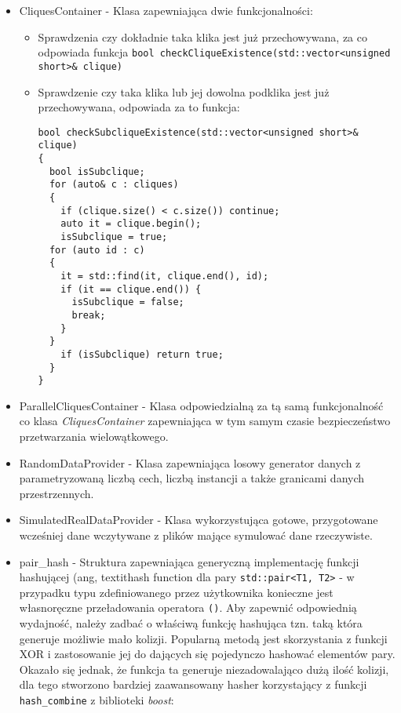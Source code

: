 \documentclass[12pt]{article}
\begin{document}
\begin{itemize}
\item CliquesContainer - Klasa zapewniająca dwie funkcjonalności:
\begin{itemize}
\item Sprawdzenia czy dokładnie taka klika jest już przechowywana, za co odpowiada funkcja \raggedleft \lstinline{bool checkCliqueExistence(std::vector<unsigned short>& clique)}
\item Sprawdzenie czy taka klika lub jej dowolna podklika jest już przechowywana, odpowiada za to funkcja:
\begin{lstlisting}
bool checkSubcliqueExistence(std::vector<unsigned short>& clique)
{
  bool isSubclique;
  for (auto& c : cliques)
  {
  	if (clique.size() < c.size()) continue;
    auto it = clique.begin();
    isSubclique = true;
  for (auto id : c)
  {
    it = std::find(it, clique.end(), id);
    if (it == clique.end()) {
      isSubclique = false;
      break;
    }
  }
    if (isSubclique) return true;
  }
}
\end{lstlisting}
\end{itemize}

\item ParallelCliquesContainer - Klasa odpowiedzialną za tą samą funkcjonalność co klasa \textit{CliquesContainer} zapewniająca w tym samym czasie bezpieczeństwo przetwarzania wielowątkowego.

\item RandomDataProvider - Klasa zapewniająca losowy generator danych z parametryzowaną liczbą cech, liczbą instancji a także granicami danych przestrzennych.

\item SimulatedRealDataProvider - Klasa wykorzystująca gotowe, przygotowane wcześniej dane wczytywane z plików mające symulować dane rzeczywiste.

\item pair\_hash - Struktura zapewniająca generyczną implementację funkcji hashującej (ang, 
textit{hash function} dla pary \lstinline{std::pair<T1, T2>} - w przypadku typu zdefiniowanego przez użytkownika konieczne jest własnoręczne przeładowania operatora \lstinline{()}. Aby zapewnić odpowiednią wydajność, należy zadbać o właściwą funkcję hashująca tzn. taką która generuje możliwie mało kolizji. Popularną metodą jest skorzystania z funkcji XOR i zastosowanie jej do dających się pojedynczo hashować elementów pary. Okazało się jednak, że funkcja ta generuje niezadowalająco dużą ilość kolizji, dla tego stworzono bardziej zaawansowany hasher korzystający z funkcji \lstinline{hash_combine} z biblioteki \textit{boost}:


\end{itemize}
\end{document}
